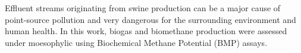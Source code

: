 Effluent streams originating from swine production can be a major cause of point-source pollution and very dangerous for the surrounding environment and human health. In this work, biogas and biomethane production were assessed under moesophylic  using Biochemical Methane Potential (BMP) assays.